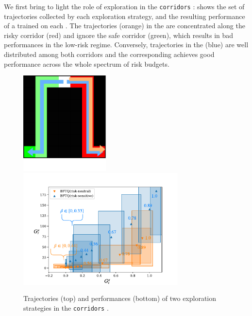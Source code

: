 We first bring to light the role of  exploration in the \texttt{corridors} :  shows the set of trajectories collected by each exploration strategy, and the resulting performance of a  trained on each . The trajectories (orange) in the   are concentrated along the risky corridor (red) and ignore the safe corridor (green), which results in bad performances in the low-risk regime. Conversely, trajectories in the   (blue) are well distributed among both corridors and the corresponding  achieves good performance across the whole spectrum of risk budgets.

\begin{figure}[tp]
    \centering
    \includegraphics[width=0.4\textwidth]{sources/contribution/nips/source/img/test.pdf}\\
    \includegraphics[page=1, width=0.75\textwidth]{sources/contribution/nips/source/img/corridors}
    \caption[Results on \texttt{Corridors}]{Trajectories (top) and performances (bottom) of two exploration strategies in the \texttt{corridors} . }
    \label{fig:exploration}
\end{figure}


